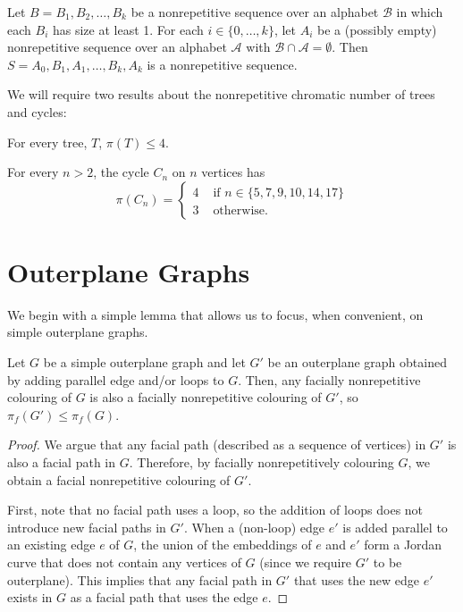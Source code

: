 \documentclass{patmorin}
\begin{document}
\begin{lem}
  Let $B=B_1,B_2,\ldots,B_k$ be a nonrepetitive sequence over an alphabet
  $\mathcal{B}$ in which each $B_i$ has size at least 1. For each $i
  \in \{0,\ldots,k\}$, let $A_i$ be a (possibly empty) nonrepetitive
  sequence over an alphabet $\mathcal{A}$ with $\mathcal{B} \cap
  \mathcal{A} = \emptyset$. Then $S = A_0, B_1, A_1, \ldots, B_k, A_k$
  is a nonrepetitive sequence.
\end{lem}

We will require two results about the nonrepetitive chromatic number of
trees and cycles:

\begin{thm}
  For every tree, $T$, $\pi(T) \leq 4$.
\end{thm}

\begin{thm}
  For every $n>2$, the cycle $C_n$ on $n$ vertices has
  \[
  \pi(C_n) = \begin{cases}
              4 & \text{ if } n \in \{5,7,9,10,14,17\} \\
              3 & \text{ otherwise. }
             \end{cases}
  \]
\end{thm}

\section{Outerplane Graphs}

We begin with a simple lemma that allows us to focus, when convenient,
on simple outerplane graphs.

\begin{lem}
  Let $G$ be a simple outerplane graph and let $G'$ be an outerplane
  graph obtained by adding parallel edge and/or loops to $G$.  Then, any
  facially nonrepetitive colouring of $G$ is also a facially nonrepetitive
  colouring of $G'$, so $\pi_f(G')\le \pi_f(G)$.
\end{lem}

\begin{proof}
   We argue that any facial path (described as a sequence of vertices)
   in $G'$ is also a facial path in $G$.  Therefore, by facially
   nonrepetitively colouring $G$, we obtain a facial nonrepetitive
   colouring of $G'$.

   First, note that no facial path uses a loop, so the addition of loops
   does not introduce new facial paths in $G'$.  When a (non-loop) edge
   $e'$ is added parallel to an existing edge $e$ of $G$, the union
   of the embeddings of $e$ and $e'$ form a Jordan curve that does not
   contain any vertices of $G$ (since we require $G'$ to be outerplane).
   This implies that any facial path in $G'$ that uses the new edge $e'$
   exists in $G$ as a facial path that uses the edge $e$.
\end{proof}
\end{document}
